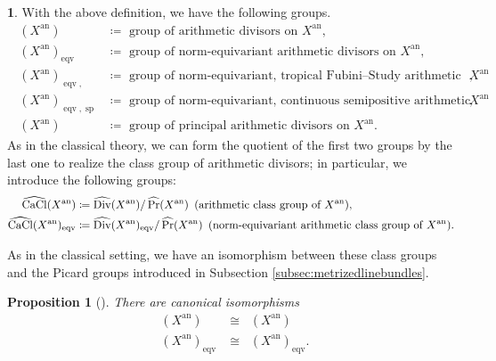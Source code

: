 \documentclass[11pt,reqno]{amsart}
\theoremstyle{theorem}
\numberwithin{equation}{subsection}
\newtheorem{prop}[subsubsection]{Proposition}
\numberwithin{equation}{subsection}
\theoremstyle{definition}
\newtheorem{notation}[subsubsection]{\text{Notation}}
\theoremstyle{remark}
\numberwithin{equation}{subsubsection} \numberwithin{figure}{section}
\DeclareMathOperator{\an}{an}
\DeclareMathOperator{\aPic}{\widehat{Pic}}
\DeclareMathOperator{\aDiv}{\widehat{Div}}
\DeclareMathOperator{\aCaCl}{\widehat{CaCl}}
\DeclareMathOperator{\aPr}{\widehat{Pr}}
\DeclareMathOperator{\tFS}{FS^{\tau}}
\DeclareMathOperator{\semip}{sp}
\DeclareMathOperator{\eqv}{eqv}
\begin{document}
\begin{notation}
With the above definition, we have the following groups.
\begin{align*}
\aDiv(X^{\an}) &\coloneqq \text{ group of arithmetic divisors on $X^{\an}$},\\
\aDiv(X^{\an})_{\eqv} &\coloneqq \text{ group of norm-equivariant arithmetic divisors on $X^{\an}$},\\
\aDiv(X^{\an})_{\eqv, \tFS} &\coloneqq \text{ group of norm-equivariant, tropical  Fubini--Study arithmetic divisors on $X^{\an}$},\\
\aDiv(X^{\an})_{\eqv, \semip} &\coloneqq \text{ group of norm-equivariant, continuous semipositive arithmetic divisors on $X^{\an}$},\\
\aPr(X^{\an}) &\coloneqq \text{ group of principal arithmetic divisors on $X^{\an}$}.
\end{align*}
As in the classical theory, we can form the quotient of the first two groups by the last one to realize the class group of arithmetic divisors; in particular, we introduce the following groups:
\begin{align*}
\aCaCl(X^{\an}) &\coloneqq \aDiv(X^{\an})/\aPr(X^{\an}) \hspace{.5em}(\text{arithmetic class group of $X^{\an}$}),\\
\aCaCl(X^{\an})_{\eqv} &\coloneqq \aDiv(X^{\an})_{\eqv}/\aPr(X^{\an}) \hspace{.5em}(\text{norm-equivariant arithmetic class group of $X^{\an}$}).
\end{align*}
\end{notation}
As in the classical setting, we have an isomorphism between these class groups and the Picard groups introduced in Subsection \ref{subsec:metrizedlinebundles}. 

\begin{prop}[]\label{prop:classisom_Berkovich}
There are canonical isomorphisms
\begin{align*}
\aCaCl(X^{\an}) & \cong \aPic(X^{\an}) \\
\aCaCl(X^{\an})_{\eqv} & \cong \aPic(X^{\an})_{\eqv}.
\end{align*}
\end{prop}
\end{document}
